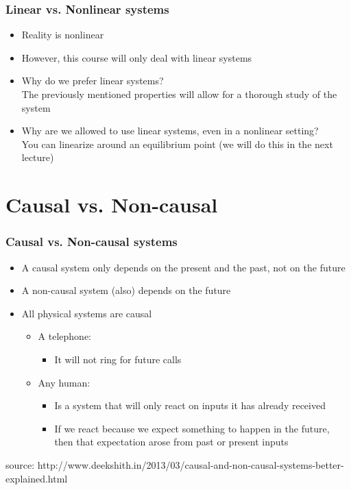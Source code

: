 \documentclass{beamer}
\begin{document}

\begin{frame}
\frametitle{Linear vs. Nonlinear systems}
\vspace{-6ex}
\begin{itemize}
\item Reality is nonlinear
\item However, this course will only deal with linear systems
\item Why do we prefer linear systems? \\
\medskip
The previously mentioned properties will allow for a thorough study of the system
\item Why are we allowed to use linear systems, even in a nonlinear setting?\\
\medskip
You can linearize around an equilibrium point (we will do this in the next lecture)
\end{itemize}
\end{frame}

\section{Causal vs. Non-causal} 

\begin{frame}
\frametitle{Causal vs. Non-causal systems}
\begin{itemize}
\item \normalsize{A causal system only depends on the present and the past, not on the future}
\item \normalsize{A non-causal system (also) depends on the future}
\item \normalsize{All physical systems are causal}
\begin{itemize}
\item \normalsize{A telephone:}
\begin{itemize}
\item \normalsize{It will not ring for future calls}
\end{itemize}
\item \normalsize{Any human:} 
\begin{itemize}
\item \normalsize{Is a system that will only react on inputs it has already received}
\item \normalsize{If we react because we expect something to happen in the future, then that expectation arose from past or present inputs}
\end{itemize}
\end{itemize}
\end{itemize}
\bigskip
\footnotesize{source: http://www.deekshith.in/2013/03/causal-and-non-causal-systems-better-explained.html}
\end{frame}
\end{document}
